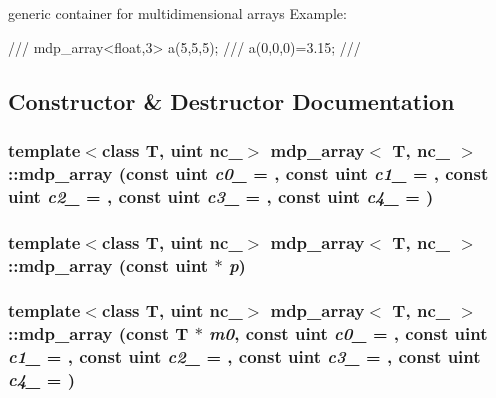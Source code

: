 generic container for multidimensional arrays Example: \begin{DoxyVerb}
///    mdp_array<float,3> a(5,5,5);
///    a(0,0,0)=3.15;
/// \end{DoxyVerb}
 

\subsection{Constructor \& Destructor Documentation}
\hypertarget{classmdp__array_a231c442576ed1a88e333fb88bcedef41}{
\subsubsection[{mdp\_\-array}]{\setlength{\rightskip}{0pt plus 5cm}template$<$class T, uint nc\_\-$>$ {\bf mdp\_\-array}$<$ T, nc\_\- $>$::{\bf mdp\_\-array} (const {\bf uint} {\em c0\_\-} = {}, \/  const {\bf uint} {\em c1\_\-} = {}, \/  const {\bf uint} {\em c2\_\-} = {}, \/  const {\bf uint} {\em c3\_\-} = {}, \/  const {\bf uint} {\em c4\_\-} = {})}}
\label{classmdp__array_a231c442576ed1a88e333fb88bcedef41}
\hypertarget{classmdp__array_a7bdd0c532c8517bf46bceab7c48f3186}{
\subsubsection[{mdp\_\-array}]{\setlength{\rightskip}{0pt plus 5cm}template$<$class T, uint nc\_\-$>$ {\bf mdp\_\-array}$<$ T, nc\_\- $>$::{\bf mdp\_\-array} (const {\bf uint} $\ast$ {\em p})}}
\label{classmdp__array_a7bdd0c532c8517bf46bceab7c48f3186}
\hypertarget{classmdp__array_abf3b0ca804544eac3be7d8e499eeb089}{
\subsubsection[{mdp\_\-array}]{\setlength{\rightskip}{0pt plus 5cm}template$<$class T, uint nc\_\-$>$ {\bf mdp\_\-array}$<$ T, nc\_\- $>$::{\bf mdp\_\-array} (const T $\ast$ {\em m0}, \/  const {\bf uint} {\em c0\_\-} = {}, \/  const {\bf uint} {\em c1\_\-} = {}, \/  const {\bf uint} {\em c2\_\-} = {}, \/  const {\bf uint} {\em c3\_\-} = {}, \/  const {\bf uint} {\em c4\_\-} = {})}}
